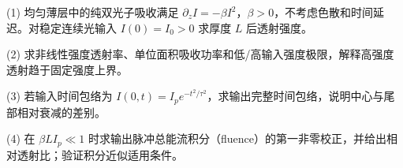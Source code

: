 (1) 均匀薄层中的纯双光子吸收满足 \(\partial_z I=-\beta I^2\)，\(\beta>0\)，不考虑色散和时间延迟。对稳定连续光输入 \(I(0)=I_0>0\) 求厚度 \(L\) 后透射强度。

(2) 求非线性强度透射率、单位面积吸收功率和低/高输入强度极限，解释高强度透射趋于固定强度上界。

(3) 若输入时间包络为 \(I(0,t)=I_p e^{-t^2/\tau^2}\)，求输出完整时间包络，说明中心与尾部相对衰减的差别。

(4) 在 \(\beta LI_p\ll1\) 时求输出脉冲总能流积分（fluence）的第一非零校正，并给出相对透射比；验证积分近似适用条件。
